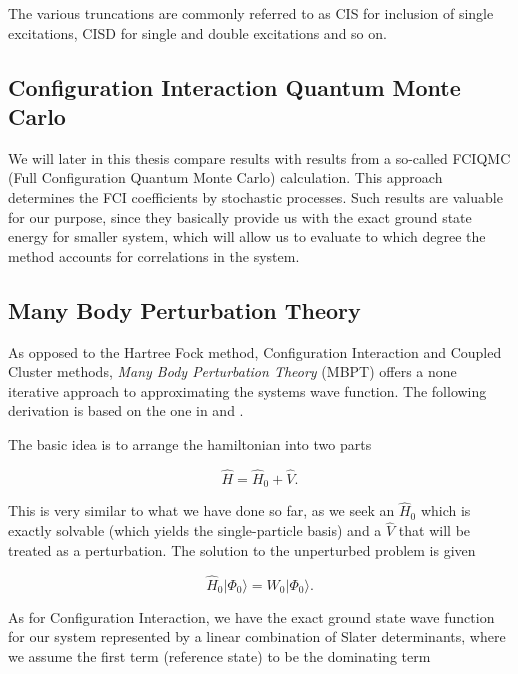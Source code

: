 The various truncations are commonly referred to as CIS for inclusion of single excitations, CISD for single and double 
excitations and so on. 

\subsection{Configuration Interaction Quantum Monte Carlo}

We will later in this thesis compare results with results from a so-called FCIQMC (Full Configuration Quantum Monte Carlo) calculation. This approach determines the FCI coefficients by stochastic processes. \cite{Booth2013} \cite{Leikanger2013} Such results are valuable for our purpose, since they basically provide us with the exact ground state energy for smaller system, which will allow us to evaluate to which degree the method accounts for correlations in the system.

\subsection{Many Body Perturbation Theory}

As opposed to the Hartree Fock method, Configuration Interaction and Coupled Cluster methods, \emph{Many Body Perturbation Theory} (MBPT) offers a none iterative approach to approximating the systems wave function. The following derivation is based on the one in \cite{ShavittBartlett2009} and \cite{hh4480}.

The basic idea is to arrange the hamiltonian into two parts

\begin{equation}
\hat{H} = \hat{H}_0 + \hat{V}.
\end{equation}

This is very similar to what we have done so far, as we seek an $\hat{H}_0$ which is exactly solvable (which yields the single-particle basis) and a $\hat{V}$ that will be treated as a perturbation. The solution to the unperturbed problem is given

\begin{equation}
\hat{H}_0 \vert \Phi_0 \rangle = W_0 \vert \Phi_0 \rangle.
\end{equation}

As for Configuration Interaction, we have the exact ground state wave function for our system represented by a linear combination of Slater determinants, where we assume the first term (reference state) to be the dominating term

